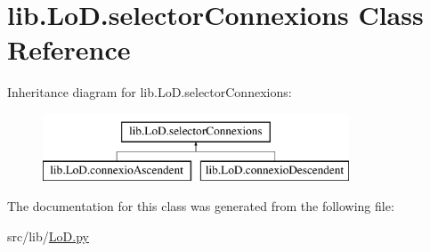 \hypertarget{classlib_1_1_lo_d_1_1selector_connexions}{\section{lib.\-Lo\-D.\-selector\-Connexions Class Reference}
\label{classlib_1_1_lo_d_1_1selector_connexions}
}
Inheritance diagram for lib.\-Lo\-D.\-selector\-Connexions\-:\begin{figure}[H]
\begin{center}
\leavevmode
\includegraphics[height=2.000000cm]{classlib_1_1_lo_d_1_1selector_connexions}
\end{center}
\end{figure}


The documentation for this class was generated from the following file\-:\begin{DoxyCompactItemize}
\item 
src/lib/\hyperlink{_lo_d_8py}{Lo\-D.\-py}\end{DoxyCompactItemize}
